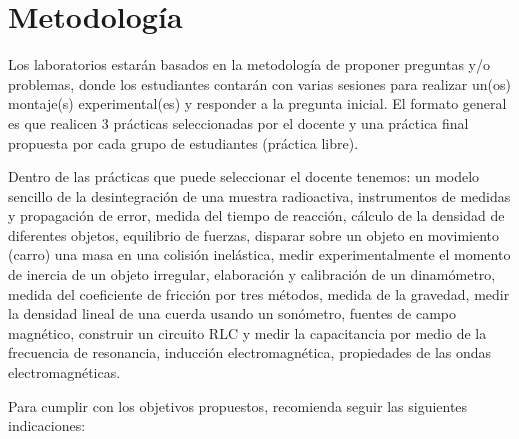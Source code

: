 \documentclass[12pt]{article}
\begin{document}
\newpage


\section{Metodología}

Los laboratorios estarán basados en la metodología de proponer preguntas y/o problemas, donde los estudiantes contarán con varias sesiones para realizar un(os) montaje(s) experimental(es) y responder a la pregunta inicial.  El formato general es que realicen 3 prácticas seleccionadas por el docente y una práctica final propuesta por cada grupo de estudiantes (práctica libre).

Dentro de las prácticas que puede seleccionar el docente tenemos:   un modelo sencillo de la desintegración de una muestra radioactiva,   instrumentos de medidas y propagación de error,  medida del tiempo de reacción,  cálculo de la densidad de diferentes objetos, equilibrio de fuerzas,  disparar sobre un objeto en movimiento (carro) una masa en una colisión inelástica,  medir experimentalmente el momento de inercia de un objeto irregular,  elaboración y calibración de un dinamómetro,  medida del coeficiente de fricción por tres métodos,  medida de la gravedad,  medir la densidad lineal de una cuerda usando un sonómetro,  fuentes de campo magnético, construir un circuito RLC y medir la capacitancia por medio de la frecuencia de resonancia,  inducción electromagnética,  propiedades de las ondas electromagnéticas.

Para cumplir con los objetivos propuestos, recomienda seguir las siguientes indicaciones:
\end{document}
